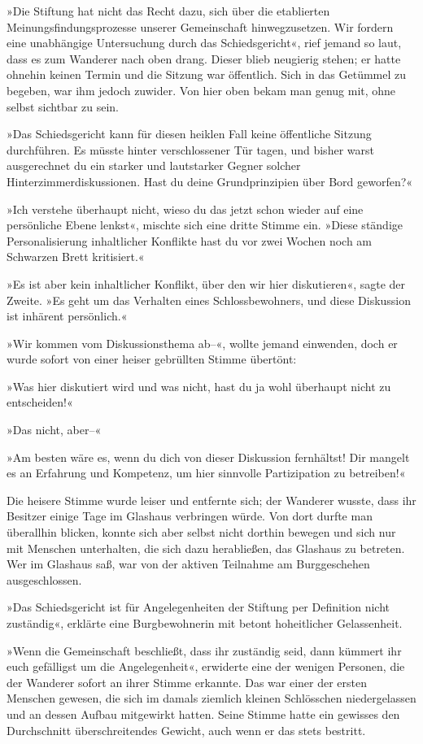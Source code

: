 »Die Stiftung hat nicht das Recht dazu, sich über die etablierten Meinungsfindungsprozesse unserer Gemeinschaft hinwegzusetzen. Wir fordern eine unabhängige Untersuchung durch das Schiedsgericht«, rief jemand so laut, dass es zum Wanderer nach oben drang. Dieser blieb neugierig stehen; er hatte ohnehin keinen Termin und die Sitzung war öffentlich. Sich in das Getümmel zu begeben, war ihm jedoch zuwider. Von hier oben bekam man genug mit, ohne selbst sichtbar zu sein.

»Das Schiedsgericht kann für diesen heiklen Fall keine öffentliche Sitzung durchführen. Es müsste hinter verschlossener Tür tagen, und bisher warst ausgerechnet du ein starker und lautstarker Gegner solcher Hinterzimmerdiskussionen. Hast du deine Grundprinzipien über Bord geworfen?«

»Ich verstehe überhaupt nicht, wieso du das jetzt schon wieder auf eine persönliche Ebene lenkst«, mischte sich eine dritte Stimme ein. »Diese ständige Personalisierung inhaltlicher Konflikte hast du vor zwei Wochen noch am Schwarzen Brett kritisiert.«

»Es ist aber kein inhaltlicher Konflikt, über den wir hier diskutieren«, sagte der Zweite. »Es geht um das Verhalten eines Schlossbewohners, und diese Diskussion ist inhärent persönlich.«

»Wir kommen vom Diskussionsthema ab–«, wollte jemand einwenden, doch er wurde sofort von einer heiser gebrüllten Stimme übertönt:

»Was hier diskutiert wird und was nicht, hast du ja wohl überhaupt nicht zu entscheiden!«

»Das nicht, aber–«

»Am besten wäre es, wenn du dich von dieser Diskussion fernhältst! Dir mangelt es an Erfahrung und Kompetenz, um hier sinnvolle Partizipation zu betreiben!«

Die heisere Stimme wurde leiser und entfernte sich; der Wanderer wusste, dass ihr Besitzer einige Tage im Glashaus verbringen würde. Von dort durfte man überallhin blicken, konnte sich aber selbst nicht dorthin bewegen und sich nur mit Menschen unterhalten, die sich dazu herabließen, das Glashaus zu betreten. Wer im Glashaus saß, war von der aktiven Teilnahme am Burggeschehen ausgeschlossen.

»Das Schiedsgericht ist für Angelegenheiten der Stiftung per Definition nicht zuständig«, erklärte eine Burgbewohnerin mit betont hoheitlicher Gelassenheit.

»Wenn die Gemeinschaft beschließt, dass ihr zuständig seid, dann kümmert ihr euch gefälligst um die Angelegenheit«, erwiderte eine der wenigen Personen, die der Wanderer sofort an ihrer Stimme erkannte. Das war einer der ersten Menschen gewesen, die sich im damals ziemlich kleinen Schlösschen niedergelassen und an dessen Aufbau mitgewirkt hatten. Seine Stimme hatte ein gewisses den Durchschnitt überschreitendes Gewicht, auch wenn er das stets bestritt.

